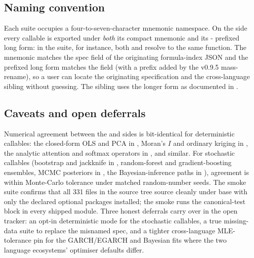 \documentclass[article,shortnames,nojss]{jss}
\begin{document}
\subsection{Naming convention}\label{sec:textbook-naming}

Each suite occupies a four-to-seven-character mnemonic
namespace. On the  side every callable is exported
under \emph{both} its compact mnemonic and its -
prefixed long form: in the  suite, for
instance, both  and
 resolve to the same
function. The mnemonic matches the spec  field of the
originating formula-index JSON and the prefixed long form matches
the  field (with a  prefix added
by the v0.9.5 mass-rename), so a user can locate the originating
specification and the cross-language sibling without guessing.  The  sibling uses the longer form
 as documented in
\citet{Ruhela2026MoriePy}.

\subsection{Caveats and open deferrals}\label{sec:textbook-caveats}

Numerical agreement between the  and 
sides is bit-identical for deterministic callables: the
closed-form OLS and PCA in , Moran's $I$
and ordinary kriging in , the analytic
attention and softmax operators in , and similar.  For stochastic callables
(bootstrap and jackknife in , random-forest
and gradient-boosting ensembles, MCMC posteriors in
, the Bayesian-inference paths in
), agreement is within Monte-Carlo
tolerance under matched random-number seeds.  The
 smoke suite confirms that all 331 
files in the source tree source cleanly under base 
with only the declared  optional packages
installed; the  smoke runs the 
canonical-test block in every shipped module.  Three honest
deferrals carry over in the open tracker: an opt-in
deterministic mode for the stochastic callables, a true
missing-data suite to replace the misnamed 
spec, and a tighter cross-language MLE-tolerance pin for the
GARCH/EGARCH and Bayesian fits where the two language
ecosystems' optimiser defaults differ.
\end{document}
